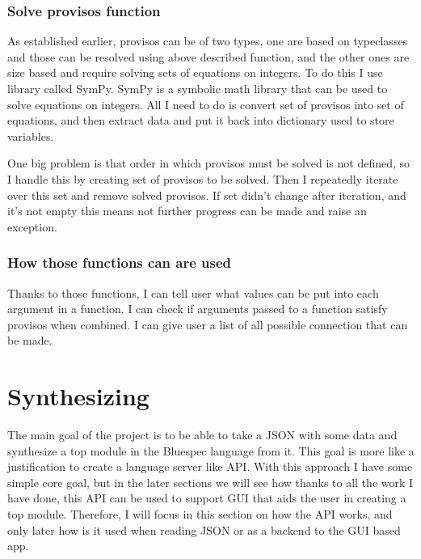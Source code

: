 \documentclass[14pt]{report}
\begin{document}
\subsubsection{Solve provisos function}
As established earlier, provisos can be of two types, one are based on typeclasses and those can be resolved using above described function, and the other ones are size based and require solving sets of equations on integers. To do this I use library called SymPy. SymPy is a symbolic math library that can be used to solve equations on integers. All I need to do is convert set of provisos into set of equations, and then extract data and put it back into dictionary used to store variables. 

One big problem is that order in which provisos must be solved is not defined, so I handle this by creating set of provisos to be solved. Then I repeatedly iterate over this set and remove solved provisos. If set didn't change after iteration, and it's not empty this means not further progress can be made and raise an exception.

\subsubsection{How those functions can are used}
Thanks to those functions, I can tell user what values can be put into each argument in a function. I can check if arguments passed to a function satisfy provisos when combined. I can give user a list of all possible connection that can be made. 

\section{Synthesizing}
The main goal of the project is to be able to take a JSON with some data and synthesize a top module in the Bluespec language from it. This goal is more like a justification to create a language server like API. With this approach I have some simple core goal, but in the later sections we will see how thanks to all the work I have done, this API can be used to support GUI that aids the user in creating a top module. Therefore, I will focus in this section on how the API works, and only later how is it used when reading JSON or as a backend to the GUI based app.
\end{document}
